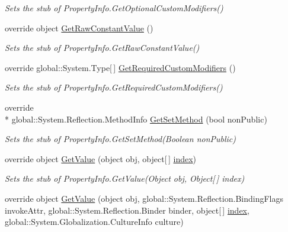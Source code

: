 \begin{DoxyCompactItemize}
\begin{DoxyCompactList}\small\item\em Sets the stub of Property\-Info.\-Get\-Optional\-Custom\-Modifiers()\end{DoxyCompactList}\item 
override object \hyperlink{class_system_1_1_reflection_1_1_fakes_1_1_stub_property_info_aa60ee5541edf8ef83bd35e482c3ab13f}{Get\-Raw\-Constant\-Value} ()
\begin{DoxyCompactList}\small\item\em Sets the stub of Property\-Info.\-Get\-Raw\-Constant\-Value()\end{DoxyCompactList}\item 
override global\-::\-System.\-Type\mbox{[}$\,$\mbox{]} \hyperlink{class_system_1_1_reflection_1_1_fakes_1_1_stub_property_info_a6601f43b574f1a102b0566aa68e2c13f}{Get\-Required\-Custom\-Modifiers} ()
\begin{DoxyCompactList}\small\item\em Sets the stub of Property\-Info.\-Get\-Required\-Custom\-Modifiers()\end{DoxyCompactList}\item 
override \\*
global\-::\-System.\-Reflection.\-Method\-Info \hyperlink{class_system_1_1_reflection_1_1_fakes_1_1_stub_property_info_a870704771ae9ca457ec180be9ea69a43}{Get\-Set\-Method} (bool non\-Public)
\begin{DoxyCompactList}\small\item\em Sets the stub of Property\-Info.\-Get\-Set\-Method(\-Boolean non\-Public)\end{DoxyCompactList}\item 
override object \hyperlink{class_system_1_1_reflection_1_1_fakes_1_1_stub_property_info_ab0009f701bd530b8dfbff2b695b02a66}{Get\-Value} (object obj, object\mbox{[}$\,$\mbox{]} \hyperlink{jquery-1_810_82-vsdoc_8js_a75bb12d1f23302a9eea93a6d89d0193e}{index})
\begin{DoxyCompactList}\small\item\em Sets the stub of Property\-Info.\-Get\-Value(\-Object obj, Object\mbox{[}$\,$\mbox{]} index)\end{DoxyCompactList}\item 
override object \hyperlink{class_system_1_1_reflection_1_1_fakes_1_1_stub_property_info_a4f9a56546c9e8cbe9e7be9a10d5eceeb}{Get\-Value} (object obj, global\-::\-System.\-Reflection.\-Binding\-Flags invoke\-Attr, global\-::\-System.\-Reflection.\-Binder binder, object\mbox{[}$\,$\mbox{]} \hyperlink{jquery-1_810_82-vsdoc_8js_a75bb12d1f23302a9eea93a6d89d0193e}{index}, global\-::\-System.\-Globalization.\-Culture\-Info culture)

\end{DoxyCompactItemize}
